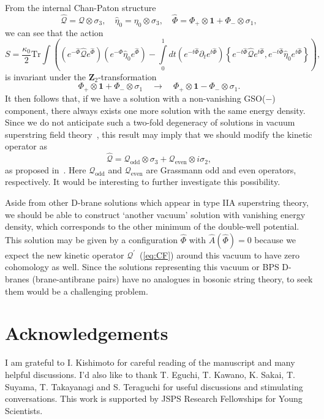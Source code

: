 \documentclass[a4paper,12pt]{article}
\newcommand{\cQ}{\mathcal{Q}}
\newcommand{\zetto}{\mathbf{Z}}
\begin{document}
From the internal Chan-Paton structure 
\[ \widehat{\cQ}=\cQ\otimes\sigma_3,\quad \widehat{\eta}_0=\eta_0\otimes\sigma_3,\quad
\widehat{\Phi}=\Phi_+\otimes\mathbf{1}+\Phi_-\otimes\sigma_1, \]
we can see that the action 
\begin{equation}
S=\frac{\kappa_0}{2}\mathrm{Tr}\int\left(\left(e^{-\widehat{\Phi}}\widehat{\cQ} e^{\widehat{\Phi}}\right)
\left(e^{-\widehat{\Phi}}\widehat{\eta}_0 e^{\widehat{\Phi}}
\right)-\int\limits_0^1dt\left(e^{-t\widehat{\Phi}}\partial_te^{t\widehat{\Phi}}\right)\left\{
e^{-t\widehat{\Phi}}\widehat{\cQ} e^{t\widehat{\Phi}},
e^{-t\widehat{\Phi}}\widehat{\eta}_0e^{t\widehat{\Phi}}\right\}\right),
\end{equation}
is invariant under the $\zetto_2$-transformation 
\begin{equation}
\Phi_+\otimes\mathbf{1}+\Phi_-\otimes\sigma_1\quad\longrightarrow\quad
\Phi_+\otimes\mathbf{1}-\Phi_-\otimes\sigma_1.
\label{eq:IA}
\end{equation}
It then follows that, if we have a solution with a non-vanishing GSO($-$) component, there always exists 
one more solution with the same energy density. Since we do not anticipate such a two-fold degeneracy 
of solutions in vacuum superstring field theory~\cite{RSZ1}, this result may imply that we should modify 
the kinetic operator as 
\begin{equation}
\widehat{\cQ}=\cQ_{\mathrm{odd}}\otimes\sigma_3+\cQ_{\mathrm{even}}\otimes i\sigma_2, \label{eq:IB}
\end{equation}
as proposed in~\cite{ABG}. Here $\cQ_{\mathrm{odd}}$ and $\cQ_{\mathrm{even}}$ are Grassmann odd and 
even operators, respectively. It would be interesting to further investigate this possibility. 
\smallskip

Aside from other D-brane solutions which appear in type IIA superstring theory, we should 
be able to construct `another vacuum' solution with vanishing energy density, which corresponds 
to the other minimum of the double-well potential. 
This solution may be given by a configuration $\widehat{\Phi}$ with $\widehat{A}(\widehat{\Phi})=0$ 
because we expect the new kinetic operator $\cQ^{\prime}$~(\ref{eq:CF}) around this vacuum to have 
zero cohomology as well. Since the solutions representing this vacuum or BPS D-branes (brane-antibrane 
pairs) have no analogues in bosonic string theory, to seek them would be a challenging problem. 

\section*{Acknowledgements}
I am grateful to I. Kishimoto for careful reading of the manuscript and many helpful discussions. 
I'd also like to thank T. Eguchi, T. Kawano, K. Sakai, T. Suyama, T. Takayanagi and S. Teraguchi   
for useful discussions and stimulating conversations. This work is supported by JSPS Research 
Fellowships for Young Scientists. 
\end{document}
